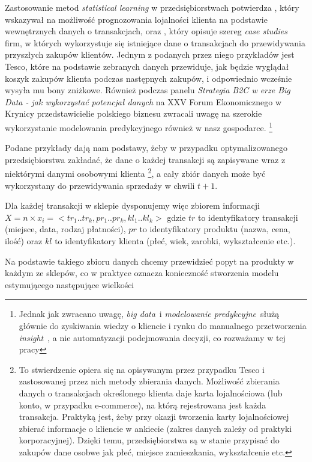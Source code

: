 \documentclass[polish, twoside, 12pt, a4paper]{article}
\theoremstyle{definition}
\theoremstyle{plain}
\theoremstyle{remark}
\begin{document}
Zastosowanie metod \textit{statistical learning} w przedsiębiorstwach potwierdza \cite{Buckinx2007}, który wskazywał na możliwość prognozowania lojalności klienta na podstawie wewnętrznych danych o transakcjach, oraz \cite{Davenport2011}, który opisuje szereg  \textit{case studies} firm, w których wykorzystuje się istniejące dane o transakcjach do przewidywania przyszłych zakupów klientów. Jednym z podanych przez niego przykładów jest Tesco, które na podstawie zebranych danych przewiduje, jak będzie wyglądał koszyk zakupów klienta podczas następnych zakupów, i odpowiednio wcześnie wysyła mu bony zniżkowe. Również podczas panelu \textit{Strategia B2C w erze Big Data - jak wykorzystać potencjał danych} na XXV Forum Ekonomicznego w Krynicy przedstawicielie polskiego biznesu zwracali uwagę na szerokie wykorzystanie modelowania predykcyjnego również w nasz gospodarce. \footnote{Jednak jak zwracano uwagę, \textit{big data}\ i \textit{modelowanie predykcyjne}\ służą głównie do zyskiwania wiedzy o kliencie i rynku do manualnego przetworzenia \textit{insight}\ , a nie automatyzacji podejmowania decyzji, co rozważamy w tej pracy}

Podane przykłady dają nam podstawy, żeby w przypadku optymalizowanego przedsiębiorstwa zakładać, że dane o każdej transakcji są zapisywane wraz z niektórymi danymi osobowymi klienta \footnote{To stwierdzenie opiera się na opisywanym przez \cite{Davenport2011} przypadku Tesco i zastosowanej przez nich metody zbierania danych. Możliwość zbierania danych o transakcjach określonego klienta daje karta lojalnościowa (lub konto, w przypadku e-commerce), na którą rejestrowana jest każda transakcja. Praktyką jest, żeby przy okazji tworzenia karty lojalnościowej zbierać informacje o kliencie w ankiecie (zakres danych zależy od praktyki korporacyjnej). Dzięki temu, przedsiębiorstwa są w stanie przypisać do zakupów dane osobwe jak płeć, miejsce zamieszkania, wykształcenie etc.}, a cały zbiór danych może być wykorzystany do przewidywania sprzedaży w chwili $t + 1$. 

Dla każdej transakcji w sklepie dysponujemy więc zbiorem informacji $ X = n \times x_i = <tr_1..tr_k, pr_1.. pr_k,kl_1..kl_k>$ gdzie $tr$ to identyfikatory transakcji (miejsce, data, rodzaj płatności), $pr$ to identyfikatory produktu (nazwa, cena, ilość) oraz $kl$ to identyfikatory klienta (płeć, wiek, zarobki, wykształcenie etc.). 

Na podstawie takiego zbioru danych chcemy przewidzieć popyt na produkty w każdym ze sklepów, co w praktyce oznacza konieczność stworzenia modelu estymującego następujące wielkości
\end{document}
